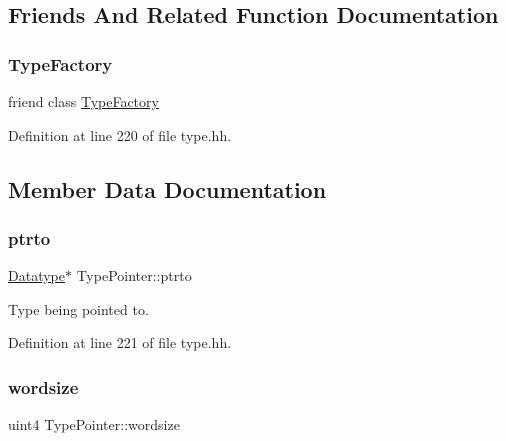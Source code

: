 \subsection{Friends And Related Function Documentation}
\mbox{\label{class_type_pointer_ac8c1945d0a63785e78b3e09a13226ed6}} 
\subsubsection{\texorpdfstring{TypeFactory}{TypeFactory}}
{\footnotesize\ttfamily friend class \mbox{\hyperlink{class_type_factory}{Type\+Factory}}\hspace{0.3cm}{\ttfamily [friend]}}



Definition at line 220 of file type.\+hh.



\subsection{Member Data Documentation}
\mbox{\label{class_type_pointer_aa8c502781518e5f51b3020ddd4ac9fe1}} 
\subsubsection{\texorpdfstring{ptrto}{ptrto}}
{\footnotesize\ttfamily \mbox{\hyperlink{class_datatype}{Datatype}}$\ast$ Type\+Pointer\+::ptrto\hspace{0.3cm}{\ttfamily [protected]}}



Type being pointed to. 



Definition at line 221 of file type.\+hh.

\mbox{\label{class_type_pointer_a32eee64befc16e8200d81477a5846ec6}} 
\subsubsection{\texorpdfstring{wordsize}{wordsize}}
{\footnotesize\ttfamily uint4 Type\+Pointer\+::wordsize\hspace{0.3cm}{\ttfamily [protected]}}



